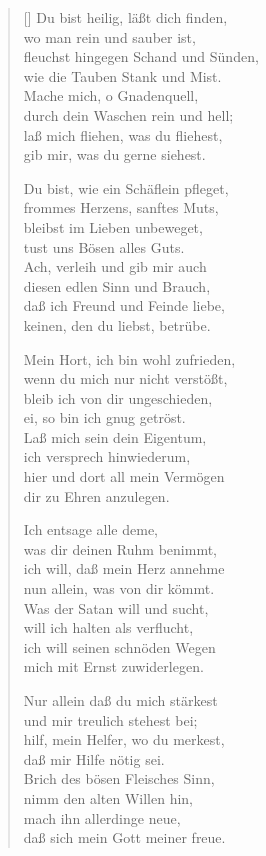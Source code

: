 \begin{multicols}{2}
\begin{verse}[\versewidth]
 Du bist heilig, läßt dich finden,\\
wo man rein und sauber ist,\\
fleuchst hingegen Schand und Sünden,\\
wie die Tauben Stank und Mist.\\
Mache mich, o Gnadenquell,\\
durch dein Waschen rein und hell;\\
laß mich fliehen, was du fliehest,\\
gib mir, was du gerne siehest.

 Du bist, wie ein Schäflein pfleget,\\
frommes Herzens, sanftes Muts,\\
bleibst im Lieben unbeweget,\\
tust uns Bösen alles Guts.\\
Ach, verleih und gib mir auch\\
diesen edlen Sinn und Brauch,\\
daß ich Freund und Feinde liebe,\\
keinen, den du liebst, betrübe.

 Mein Hort, ich bin wohl zufrieden,\\
wenn du mich nur nicht verstößt,\\
bleib ich von dir ungeschieden,\\
ei, so bin ich gnug getröst.\\
Laß mich sein dein Eigentum,\\
ich versprech hinwiederum,\\
hier und dort all mein Vermögen\\
dir zu Ehren anzulegen.

 Ich entsage alle deme,\\
was dir deinen Ruhm benimmt,\\
ich will, daß mein Herz annehme\\
nun allein, was von dir kömmt.\\
Was der Satan will und sucht,\\
will ich halten als verflucht,\\
ich will seinen schnöden Wegen\\
mich mit Ernst zuwiderlegen.

 Nur allein daß du mich stärkest\\
und mir treulich stehest bei;\\
hilf, mein Helfer, wo du merkest,\\
daß mir Hilfe nötig sei.\\
Brich des bösen Fleisches Sinn,\\
nimm den alten Willen hin,\\
mach ihn allerdinge neue,\\
daß sich mein Gott meiner freue.


\end{verse}
\end{multicols}
